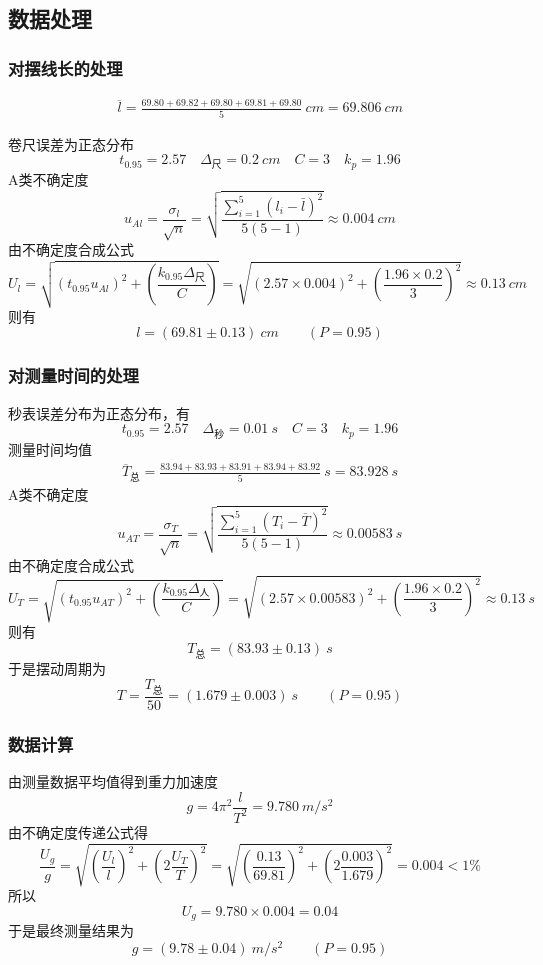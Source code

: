 \documentclass[12pt]{article}
\begin{document}
\subsection*{数据处理}

\subsubsection*{对摆线长的处理}
\begin{align*}
    \overline{l}=\frac{69.80+69.82+69.80+69.81+69.80}{5}\SI{}{cm}= \SI{69.806}{cm}
\end{align*}

卷尺误差为正态分布
\[t_{0.95}=2.57\quad \Delta_{\text{尺}}=\SI{0.2}{cm}\quad C=3\quad k_p=1.96\]
A类不确定度
\[u_{Al}=\frac{\sigma_l}{\sqrt{n}}=\sqrt{\frac{\sum_{i=1}^{5}(l_i-\bar{l})^2}{5(5-1)}}\approx\SI{0.004}{cm}\]
由不确定度合成公式
\[U_{l}=\sqrt{\left(t_{0.95}u_{Al}\right)^2+\left(\frac{k_{0.95}\Delta_{\text{尺}}}{C}\right)}=\sqrt{(2.57\times 0.004)^2+\left(\frac{1.96\times 0.2}{3}\right)^2}\approx\SI{0.13}{cm}\]
则有
\[l=(69.81\pm 0.13)\SI{}{cm}\qquad (P=0.95)\]

\subsubsection*{对测量时间的处理}
秒表误差分布为正态分布，有
\[t_{0.95}=2.57\quad \Delta_{\text{秒}}=\SI{0.01}{s}\quad C=3\quad k_p=1.96\]
测量时间均值
\begin{align*}
    \overline{T}_{\text{总}}=\frac{83.94+83.93+83.91+83.94+83.92}{5}\SI{}{s}=\SI{83.928}{s}
\end{align*}
A类不确定度
\[u_{AT}=\frac{\sigma_T}{\sqrt{n}}=\sqrt{\frac{\sum_{i=1}^{5}(T_i-\overline{T})^2}{5(5-1)}}\approx\SI{0.00583}{s}\]
由不确定度合成公式
\[U_{T}=\sqrt{\left(t_{0.95}u_{AT}\right)^2+\left(\frac{k_{0.95}\Delta_{\text{人}}}{C}\right)}=\sqrt{(2.57\times 0.00583)^2+\left(\frac{1.96\times 0.2}{3}\right)^2}\approx\SI{0.13}{s}\]
则有
\[T_{\text{总}}=(83.93\pm 0.13)\SI{}{s}\]
于是摆动周期为
\[ T=\frac{T_{\text{总}}}{50}=(1.679\pm 0.003)\SI{}{s}\qquad (P=0.95)\]

\subsubsection*{数据计算}
由测量数据平均值得到重力加速度
\begin{equation*}
    g=4\pi^2\frac{l}{T^2}=\SI{9.780}{m/s^2}
\end{equation*}
由不确定度传递公式得
\[\frac{U_g}{g}=\sqrt{\left(\frac{U_l}{l}\right)^2+\left(2\frac{U_T}{T}\right)^2}=\sqrt{\left(\frac{0.13}{69.81}\right)^2+\left(2\frac{0.003}{1.679}\right)^2}=0.004<1\%\]
所以
\[U_g=9.780\times 0.004=0.04\]
于是最终测量结果为 
\[g=(9.78\pm 0.04)\SI{}{m/s^2}\qquad (P=0.95)\]
\end{document}
